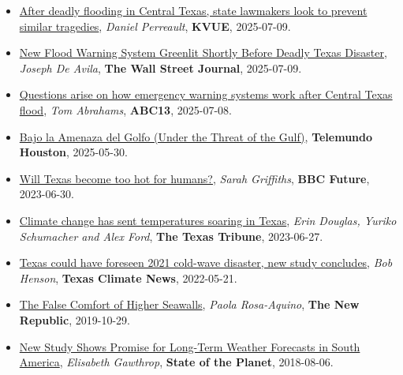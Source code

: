 \documentclass[10pt,oneside]{article}
\begin{document}
\begin{itemize}[label={}]
  
  \item \href{https://www.kvue.com/article/news/politics/special-session/central-texas-flooding-special-session/269-2e5a87d4-ec92-4fb8-b850-748de1a6cbbe}{After deadly flooding in Central Texas, state lawmakers look to prevent similar tragedies}, \textit{Daniel Perreault}, \textbf{KVUE}, 2025-07-09.
        
  \item \href{https://www.wsj.com/us-news/climate-environment/texas-guadalupe-flood-threat-system-06c29954}{New Flood Warning System Greenlit Shortly Before Deadly Texas Disaster}, \textit{Joseph De Avila}, \textbf{The Wall Street Journal}, 2025-07-09.
        
  \item \href{https://abc13.com/post/questions-arise-how-emergency-warning-systems-work-central-texas-flood/17024010/}{Questions arise on how emergency warning systems work after Central Texas flood}, \textit{Tom Abrahams}, \textbf{ABC13}, 2025-07-08.
        
  \item \href{https://www.telemundohouston.com/noticias/bajo-la-amenaza-del-golfo-parte-1-2/2494095/}{Bajo la Amenaza del Golfo (Under the Threat of the Gulf)}, \textbf{Telemundo Houston}, 2025-05-30.
        
  \item \href{https://www.bbc.com/future/article/20230630-will-texas-become-too-hot-for-humans}{Will Texas become too hot for humans?}, \textit{Sarah Griffiths}, \textbf{BBC Future}, 2023-06-30.
        
  \item \href{https://www.texastribune.org/2023/06/27/texas-climate-change-heat/}{Climate change has sent temperatures soaring in Texas}, \textit{Erin Douglas, Yuriko Schumacher and Alex Ford}, \textbf{The Texas Tribune}, 2023-06-27.
        
  \item \href{https://texasclimatenews.org/2022/05/21/texas-could-have-foreseen-2021-cold-wave-disaster-new-study-concludes/}{Texas could have foreseen 2021 cold-wave disaster, new study concludes}, \textit{Bob Henson}, \textbf{Texas Climate News}, 2022-05-21.
        
  \item \href{https://newrepublic.com/article/155519/false-comfort-higher-seawalls}{The False Comfort of Higher Seawalls}, \textit{Paola Rosa-Aquino}, \textbf{The New Republic}, 2019-10-29.
        
  \item \href{https://blogs.ei.columbia.edu/2018/08/06/subseasonal-weather-forecasts-paraguay/}{New Study Shows Promise for Long-Term Weather Forecasts in South America}, \textit{Elisabeth Gawthrop}, \textbf{State of the Planet}, 2018-08-06.
        
\end{itemize}
\end{document}
